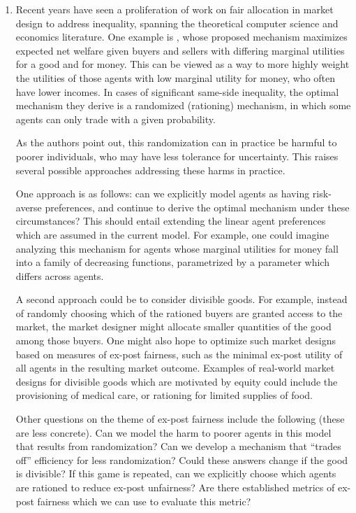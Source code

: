 \documentclass[JEL]{AEA}
\begin{document}
\begin{enumerate}
    \item Recent years have seen a proliferation of work on fair allocation in market design to address inequality, spanning the theoretical computer science and economics literature. One example is \cite{akbarpour-2020}, whose proposed mechanism maximizes expected net welfare given buyers and sellers with differing marginal utilities for a good and for money. This can be viewed as a way to more highly weight the utilities of those agents with low marginal utility for money, who often have lower incomes. In cases of significant same-side inequality, the optimal mechanism they derive is a randomized (rationing) mechanism, in which some agents can only trade with a given probability.

    As the authors point out, this randomization can in practice be harmful to poorer individuals, who may have less tolerance for uncertainty. This raises several possible approaches addressing these harms in practice.
    
    One approach is as follows: can we explicitly model agents as having risk-averse preferences, and continue to derive the optimal mechanism under these circumstances? This should entail extending the linear agent preferences which are assumed in the current model. For example, one could imagine analyzing this mechanism for agents whose marginal utilities for money fall into a family of decreasing functions, parametrized by a parameter which differs across agents.
    
    A second approach could be to consider divisible goods. For example, instead of randomly choosing which of the rationed buyers are granted access to the market, the market designer might allocate smaller quantities of the good among those buyers. One might also hope to optimize such market designs based on measures of ex-post fairness, such as the minimal ex-post utility of all agents in the resulting market outcome. Examples of real-world market designs for divisible goods which are motivated by equity could include the provisioning of medical care, or rationing for limited supplies of food.

    Other questions on the theme of ex-post fairness include the following (these are less concrete). Can we model the harm to poorer agents in this model that results from randomization? Can we develop a mechanism that ``trades off'' efficiency for less randomization? Could these answers change if the good is divisible? If this game is repeated, can we explicitly choose which agents are rationed to reduce ex-post unfairness? Are there established metrics of ex-post fairness which we can use to evaluate this metric?


\end{enumerate}
\end{document}
